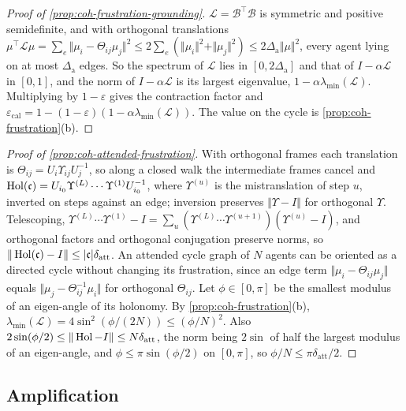 \begin{proof}[Proof of \cref{prop:coh-frustration-grounding}]
$\mathcal L=\mathcal B^\top\mathcal B$ is symmetric and positive semidefinite, and with orthogonal translations $\mu^\top\mathcal L\mu=\sum_e\Vert\mu_i-\Theta_{ij}\mu_j\Vert^2\le2\sum_e(\Vert\mu_i\Vert^2+\Vert\mu_j\Vert^2)\le2\Delta_{\mathrm a}\Vert\mu\Vert^2$, every agent lying on at most $\Delta_{\mathrm a}$ edges. So the spectrum of $\mathcal L$ lies in $[0,2\Delta_{\mathrm a}]$ and that of $I-\alpha\mathcal L$ in $[0,1]$, and the norm of $I-\alpha\mathcal L$ is its largest eigenvalue, $1-\alpha\lambda_{\min}(\mathcal L)$. Multiplying by $1-\varepsilon$ gives the contraction factor and $\varepsilon_{\mathrm{cal}}=1-(1-\varepsilon)(1-\alpha\lambda_{\min}(\mathcal L))$. The value on the cycle is \cref{prop:coh-frustration}(b).
\end{proof}

\begin{proof}[Proof of \cref{prop:coh-attended-frustration}]
With orthogonal frames each translation is $\Theta_{ij}=U_i\Upsilon_{ij}U_j^{-1}$, so along a closed walk the intermediate frames cancel and $\operatorname{Hol}(\mathfrak c)=U_{i_0}\Upsilon^{(L)}\cdots\Upsilon^{(1)}U_{i_0}^{-1}$, where $\Upsilon^{(u)}$ is the mistranslation of step $u$, inverted on steps against an edge; inversion preserves $\Vert\Upsilon-I\Vert$ for orthogonal $\Upsilon$. Telescoping, $\Upsilon^{(L)}\cdots\Upsilon^{(1)}-I=\sum_u(\Upsilon^{(L)}\cdots\Upsilon^{(u+1)})(\Upsilon^{(u)}-I)$, and orthogonal factors and orthogonal conjugation preserve norms, so $\Vert\operatorname{Hol}(\mathfrak c)-I\Vert\le|\mathfrak c|\delta_{\mathrm{att}}$. An attended cycle graph of $N$ agents can be oriented as a directed cycle without changing its frustration, since an edge term $\Vert\mu_i-\Theta_{ij}\mu_j\Vert$ equals $\Vert\mu_j-\Theta_{ij}^{-1}\mu_i\Vert$ for orthogonal $\Theta_{ij}$. Let $\phi\in[0,\pi]$ be the smallest modulus of an eigen-angle of its holonomy. By \cref{prop:coh-frustration}(b), $\lambda_{\min}(\mathcal L)=4\sin^2(\phi/(2N))\le(\phi/N)^2$. Also $2\sin(\phi/2)\le\Vert\operatorname{Hol}-I\Vert\le N\delta_{\mathrm{att}}$, the norm being $2\sin$ of half the largest modulus of an eigen-angle, and $\phi\le\pi\sin(\phi/2)$ on $[0,\pi]$, so $\phi/N\le\pi\delta_{\mathrm{att}}/2$.
\end{proof}

\subsection{Amplification}\label{app:coh-amplification}

